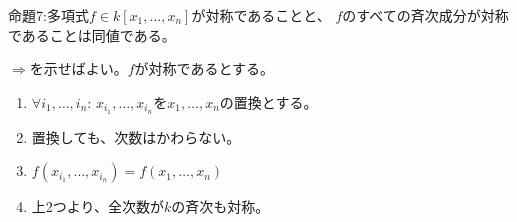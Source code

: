 \begin{framed}
  命題7:多項式$f\in k[x_1,\dots,x_n]$が対称であることと、
  $f$のすべての斉次成分が対称であることは同値である。
\end{framed}
\begin{myproof}
  $\Rightarrow$を示せばよい。$f$が対称であるとする。
  \begin{enumerate}
    \item
    $\forall i_1,\dots,i_n$:
    $x_{i_1},\dots,x_{i_n}$を$x_1,\dots,x_n$の置換とする。
    \item
    置換しても、次数はかわらない。
    \item
    $f(x_{i_1},\dots,x_{i_n}) = f(x_1,\dots,x_n)$
    \item
    上2つより、全次数が$k$の斉次も対称。
  \end{enumerate}
\end{myproof}

